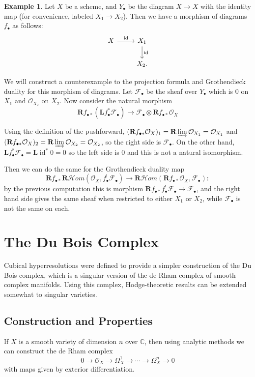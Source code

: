 \documentclass[proquest]{uwthesis}[2014/11/13]
\theoremstyle{definition}
\newtheorem{example}[theorem]{Example}
\newcommand{\cHom}{\mathcal{H} \textit{om}}
\DeclareMathOperator{\id}{id}
\newcommand{\CC}{\mathbb{C}}
\newcommand{\FF}{\mathscr{F}}
\newcommand{\bL}{\textbf{L}}
\newcommand{\OO}{\mathcal{O}}
\newcommand{\bR}{\textbf{R}}
\begin{document}
\begin{example}
	\label{ex:dualitycounter}
	Let $X$ be a scheme, and $Y_\bullet$ be the diagram $X \rightarrow X$ with the identity map (for convenience, labeled $X_1 \rightarrow X_2$).
	Then we have a morphism of diagrams $f_\bullet$ as follows:
	\[
	\begin{tikzcd}
		X \arrow{r}{\id} & X_1 \arrow{d}{\id} \\
		& X_2.
	\end{tikzcd}
	\]
	
	We will construct a counterexample to the projection formula and Grothendieck duality for this morphism of diagrams.
	Let $\FF_\bullet$ be the sheaf over $Y_\bullet$ which is 0 on $X_1$ and $\OO_{X_2}$ on $X_2$.
	Now consider the natural morphism
	\[
		\bR f_{\bullet *} (\bL f_\bullet^* \FF_\bullet) \rightarrow \FF_\bullet \otimes \bR f_{\bullet *} \OO_X
	\]
	
	Using the definition of the pushforward, $(\bR f_{\bullet *} \OO_X)_1 = \bR \varinjlim \OO_{X_1} = \OO_{X_1}$ and $(\bR f_{\bullet *} \OO_X)_2 = \bR \varinjlim \OO_{X_2} = \OO_{X_2}$, so the right side is $\FF_\bullet$.
	On the other hand, $\bL f_\bullet^* \FF_\bullet = \bL \id^* 0 = 0$ so the left side is 0 and this is not a natural isomorphism.
	
	Then we can do the same for the Grothendieck duality map
	\[
		\bR f_{\bullet *} \bR \cHom(\OO_X, f_\bullet^! \FF_\bullet) \rightarrow \bR \cHom(\bR f_{\bullet *} \OO_X , \FF_\bullet):
	\]
	by the previous computation this is morphism $\bR f_{\bullet *} f_\bullet^! \FF_\bullet \rightarrow \FF_\bullet$, and the right hand side gives the same sheaf when restricted to either $X_1$ or $X_2$, while $\FF_\bullet$ is not the same on each.
\end{example}

\chapter{The Du Bois Complex}
\label{chp:duboiscomplex}

Cubical hyperresolutions were defined to provide a simpler construction of the Du Bois complex, which is a singular version of the de Rham complex of smooth complex manifolds.
Using this complex, Hodge-theoretic results can be extended somewhat to singular varieties.
\section{Construction and Properties}
If $X$ is a smooth variety of dimension $n$ over $\CC$, then using analytic methods we can construct the de Rham complex
\[
0 \rightarrow \OO_X \rightarrow \Omega_X^1 \rightarrow \cdots \rightarrow \Omega_X^n \rightarrow 0
\]
with maps given by exterior differentiation.
\end{document}
